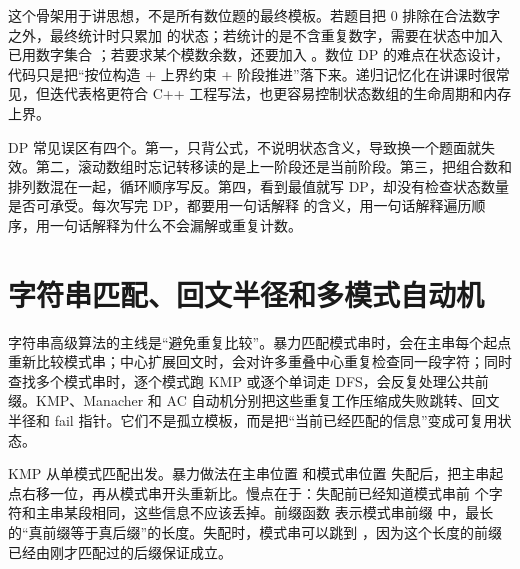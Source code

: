 这个骨架用于讲思想，不是所有数位题的最终模板。若题目把 0 排除在合法数字之外，最终统计时只累加  的状态；若统计的是不含重复数字，需要在状态中加入已用数字集合 ；若要求某个模数余数，还要加入 。数位 DP 的难点在状态设计，代码只是把“按位构造 + 上界约束 + 阶段推进”落下来。递归记忆化在讲课时很常见，但迭代表格更符合 C++ 工程写法，也更容易控制状态数组的生命周期和内存上界。

\begin{warningbox}
DP 常见误区有四个。第一，只背公式，不说明状态含义，导致换一个题面就失效。第二，滚动数组时忘记转移读的是上一阶段还是当前阶段。第三，把组合数和排列数混在一起，循环顺序写反。第四，看到最值就写 DP，却没有检查状态数量是否可承受。每次写完 DP，都要用一句话解释  的含义，用一句话解释遍历顺序，用一句话解释为什么不会漏解或重复计数。
\end{warningbox}

\section{字符串匹配、回文半径和多模式自动机}

字符串高级算法的主线是“避免重复比较”。暴力匹配模式串时，会在主串每个起点重新比较模式串；中心扩展回文时，会对许多重叠中心重复检查同一段字符；同时查找多个模式串时，逐个模式跑 KMP 或逐个单词走 DFS，会反复处理公共前缀。KMP、Manacher 和 AC 自动机分别把这些重复工作压缩成失败跳转、回文半径和 fail 指针。它们不是孤立模板，而是把“当前已经匹配的信息”变成可复用状态。

KMP 从单模式匹配出发。暴力做法在主串位置  和模式串位置  失配后，把主串起点右移一位，再从模式串开头重新比。慢点在于：失配前已经知道模式串前  个字符和主串某段相同，这些信息不应该丢掉。前缀函数  表示模式串前缀  中，最长的“真前缀等于真后缀”的长度。失配时，模式串可以跳到 ，因为这个长度的前缀已经由刚才匹配过的后缀保证成立。

